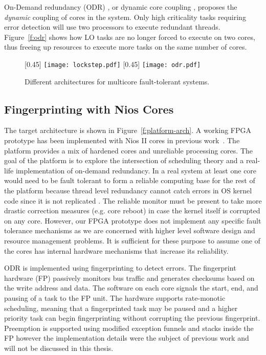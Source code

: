 	On-Demand redundancy (ODR) \cite{Meyer:CASES11,fu2013demand}, or dynamic core coupling \cite{lafrieda2007utilizing}, proposes the \emph{dynamic} coupling of cores in the system. 
	Only high criticality tasks requiring error detection will use two processors to execute redundant threads. 
	Figure~\ref{f:odr} shows how LO tasks are no longer forced to execute on two cores, thus freeing up resources to execute more tasks on the same number of cores.


\begin{figure}
\captionsetup[subfigure]{singlelinecheck=false}
\centering
{}[0.45\textwidth]
{
    \texttt{[image: lockstep.pdf]}
}%
\hfill
{}[0.45\textwidth]
{
    \texttt{[image: odr.pdf]}
}%
\caption[Short Caption]{Different architectures for multicore fault-tolerant systems.}
\label{f:ft-arch}
\end{figure}


\subsection{Fingerprinting with Nios Cores}
\label{s:nios}
	The target architecture is shown in Figure~\ref{f:platform-arch}. 
	A working FPGA prototype has been implemented with Nios II cores in previous work~\cite{ugthesis}. 
	The platform provides a mix of hardened cores and unreliable processing cores. 
	The goal of the platform is to explore the intersection of scheduling theory and a real-life implementation of on-demand redundancy. 
	In a real system at least one core would need to be fault tolerant to form a reliable computing base for the rest of the platform because thread level redundancy cannot catch errors in OS kernel code since it is not replicated \cite{dobel2012watches}. 
	The reliable monitor must be present to take more drastic correction measures (e.g. core reboot) in case the kernel itself is corrupted on any core.
	However, our FPGA prototype does not implement any specific fault tolerance mechanisms as we are concerned with higher level software design and resource management problems. 
	It is sufficient for these purpose to assume one of the cores has internal hardware mechanisms that increase its reliability.



	ODR is implemented using fingerprinting \cite{Smolens:04} to detect errors. 
	The fingerprint hardware (FP) passively monitors bus traffic and generates checksums based on the write address and data.
	The software on each core signals the start, end, and pausing of a task to the FP unit.
	The hardware supports rate-monotic scheduling, meaning that a fingerprinted task may be paused and a higher priority task can begin fingerprinting without corrupting the previous fingerprint.
	Preemption is supported using modified exception funnels and stacks inside the FP however the implementation details were the subject of previous work \cite{ugthesis} and will not be discussed in this thesis.
	
